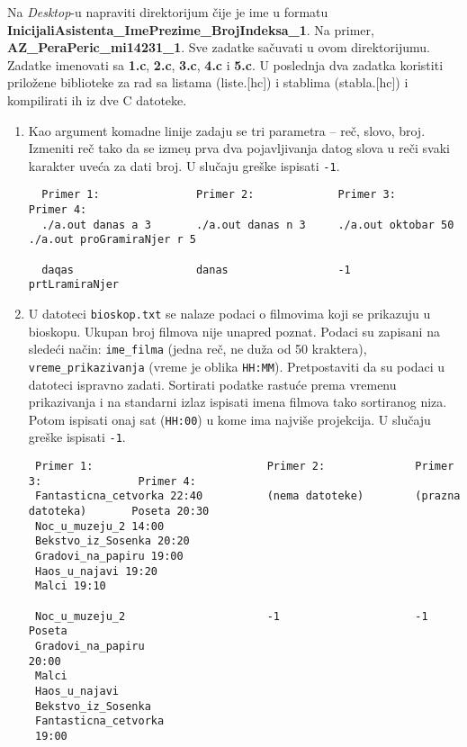 Na \textit{Desktop}-u napraviti direktorijum \v cije je ime u formatu
\textbf{InicijaliAsistenta\_ImePrezime\_BrojIndeksa\_1}. Na primer,
\textbf{AZ\_PeraPeric\_mi14231\_1}. Sve zadatke sa\v cuvati u ovom
direktorijumu. Zadatke imenovati sa \textbf{1.c}, \textbf{2.c},
\textbf{3.c}, \textbf{4.c} i \textbf{5.c}. U poslednja dva zadatka
koristiti prilo\v zene biblioteke za rad sa listama (liste.[hc]) i
stablima (stabla.[hc]) i kompilirati ih iz dve C datoteke.

\begin{enumerate}
\item 
Kao argument komadne linije zadaju se tri parametra -- re\v c, slovo,
broj. Izmeniti re\v c tako da se izme\d u prva dva pojavljivanja datog
slova u re\v ci svaki karakter uve\'ca za dati broj.  U slu\v caju
gre\v ske ispisati {\tt -1}.
\begin{verbatim}
  Primer 1:               Primer 2:             Primer 3:             Primer 4:
  ./a.out danas a 3       ./a.out danas n 3     ./a.out oktobar 50    ./a.out proGramiraNjer r 5

  daqas                   danas                 -1                    prtLramiraNjer
\end{verbatim}


\item
U datoteci {\tt bioskop.txt} se nalaze podaci o filmovima koji se
prikazuju u bioskopu. Ukupan broj filmova nije unapred poznat. Podaci
su zapisani na slede\'ci na\v cin: {\tt ime\_filma} (jedna re\v c, ne
du\v za od 50 kraktera), {\tt vreme\_prikazivanja} (vreme je oblika
{\tt HH:MM}).  Pretpostaviti da su podaci u datoteci ispravno zadati.
Sortirati podatke rastu\'ce prema vremenu prikazivanja i na standarni
izlaz ispisati imena filmova tako sortiranog niza. Potom ispisati onaj
sat ({\tt HH:00}) u kome ima najvi\v se projekcija.  U slu\v caju
gre\v ske ispisati {\tt -1}.
\begin{verbatim}
 Primer 1:                           Primer 2:              Primer 3:               Primer 4:
 Fantasticna_cetvorka 22:40          (nema datoteke)        (prazna datoteka)       Poseta 20:30
 Noc_u_muzeju_2 14:00 
 Bekstvo_iz_Sosenka 20:20
 Gradovi_na_papiru 19:00
 Haos_u_najavi 19:20
 Malci 19:10
 
 Noc_u_muzeju_2                      -1                     -1                      Poseta
 Gradovi_na_papiru                                                                  20:00
 Malci
 Haos_u_najavi
 Bekstvo_iz_Sosenka
 Fantasticna_cetvorka
 19:00
\end{verbatim}


\end{enumerate}
